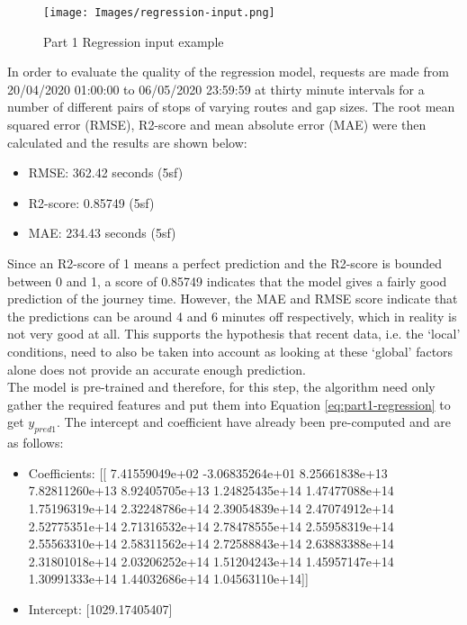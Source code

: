\begin{figure}[H]
\begin{center}
    \texttt{[image: Images/regression-input.png]}
    \caption{Part 1 Regression input example}
    \label{fig:part1-regression-input}
\end{center}
\end{figure}

In order to evaluate the quality of the regression model, requests are made from 20/04/2020 01:00:00 to 06/05/2020 23:59:59 at thirty minute intervals for a number of different pairs of stops of varying routes and gap sizes. The root mean squared error (RMSE), R2-score and mean absolute error (MAE) were then calculated and the results are shown below:  

\begin{itemize}
    \item RMSE: 362.42 seconds (5sf)
    \item R2-score: 0.85749 (5sf)
    \item MAE: 234.43 seconds (5sf)
\end{itemize}

Since an R2-score of 1 means a perfect prediction and the R2-score is bounded between 0 and 1, a score of 0.85749 indicates that the model gives a fairly good prediction of the journey time. However, the MAE and RMSE score indicate that the predictions can be around 4 and 6 minutes off respectively, which in reality is not very good at all. This supports the hypothesis that recent data, i.e. the `local' conditions, need to also be taken into account as looking at these `global' factors alone does not provide an accurate enough prediction. \\

The model is pre-trained and therefore, for this step, the algorithm need only gather the required features and put them into Equation \ref{eq:part1-regression} to get $y_{pred1}$. The intercept and coefficient have already been pre-computed and are as follows:

\begin{itemize}
    \item Coefficients: [[ 7.41559049e+02 -3.06835264e+01  8.25661838e+13  7.82811260e+13
   8.92405705e+13  1.24825435e+14  1.47477088e+14  1.75196319e+14
   2.32248786e+14  2.39054839e+14  2.47074912e+14  2.52775351e+14
   2.71316532e+14  2.78478555e+14  2.55958319e+14  2.55563310e+14
   2.58311562e+14  2.72588843e+14  2.63883388e+14  2.31801018e+14
   2.03206252e+14  1.51204243e+14  1.45957147e+14  1.30991333e+14
   1.44032686e+14  1.04563110e+14]]
   \item Intercept: [1029.17405407]
\end{itemize}

